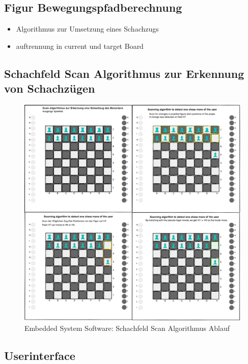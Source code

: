 \hypertarget{figur-bewegungspfadberechnung}{%
\subsection{Figur
Bewegungspfadberechnung}\label{figur-bewegungspfadberechnung}}

\begin{itemize}
\tightlist
\item
  Algorithmus zur Umsetzung eines Schachzugs
\item
  auftrennung in current und target Board
\end{itemize}

\hypertarget{schachfeld-scan-algorithmus-zur-erkennung-von-schachzuxfcgen}{%
\subsection{Schachfeld Scan Algorithmus zur Erkennung von
Schachzügen}\label{schachfeld-scan-algorithmus-zur-erkennung-von-schachzuxfcgen}}

\begin{figure}
\centering
\includegraphics{images/ATC_ChessMoveAlgorithm.png}
\caption{Embedded System Software: Schachfeld Scan Algorithmus Ablauf}
\end{figure}

\hypertarget{userinterface}{%
\subsection{Userinterface}\label{userinterface}}


